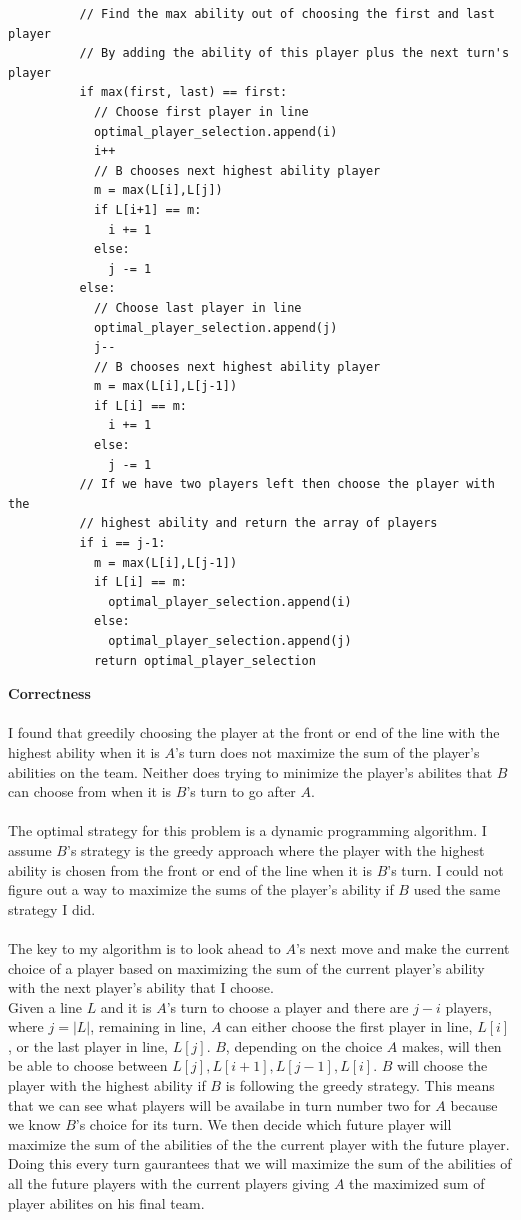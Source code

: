 \documentclass[12pt]{article}
\begin{document}
\begin{enumerate}
\begin{verbatim}
		  // Find the max ability out of choosing the first and last player
		  // By adding the ability of this player plus the next turn's player
		  if max(first, last) == first:
		    // Choose first player in line
		    optimal_player_selection.append(i)
		    i++
		    // B chooses next highest ability player
		    m = max(L[i],L[j])
		    if L[i+1] == m:
		  	  i += 1
		    else:
		      j -= 1
		  else:
		    // Choose last player in line
		    optimal_player_selection.append(j)
		    j--
		    // B chooses next highest ability player
		    m = max(L[i],L[j-1])
		    if L[i] == m:
		  	  i += 1
		    else:
		      j -= 1
		  // If we have two players left then choose the player with the 
		  // highest ability and return the array of players 
		  if i == j-1:
		    m = max(L[i],L[j-1])
		    if L[i] == m:
		  	  optimal_player_selection.append(i)
		    else:
		      optimal_player_selection.append(j)
		    return optimal_player_selection
		\end{verbatim}
		\textbf{Correctness}\\
		\\
		I found that greedily choosing the player at the front or end of the line with the highest ability when it is $A$'s turn does not maximize the sum of the player's abilities on the team.  Neither does trying to minimize the player's abilites that $B$ can choose from when it is $B$'s turn to go after $A$.\\
		\\
		The optimal strategy for this problem is a dynamic programming algorithm.  I assume $B$'s strategy is the greedy approach where the player with the highest ability is chosen from the front or end of the line when it is $B$'s turn.  I could not figure out a way to maximize the sums of the player's ability if $B$ used the same strategy I did.\\
		\\
		The key to my algorithm is to look ahead to $A$'s next move and make the current choice of a player based on maximizing the sum of the current player's ability with the next player's ability that I choose.\\
		Given a line $L$ and it is $A$'s turn to choose a player and there are $j - i$ players, where $j = |L|$, remaining in line, $A$ can either choose the first player in line, $L[i]$, or the last player in line, $L[j]$.  $B$, depending on the choice $A$ makes, will then be able to choose between $L[j], L[i+1], L[j-1], L[i]$.  $B$ will choose the player with the highest ability if $B$ is following the greedy strategy.  This means that we can see what players will be availabe in turn number two for $A$ because we know $B$'s choice for its turn.  We then decide which future player will maximize the sum of the abilities of the the current player with the future player.  Doing this every turn gaurantees that we will maximize the sum of the abilities of all the future players with the current players giving $A$ the maximized sum of player abilites on his final team.\\    

\end{enumerate}
\end{document}
